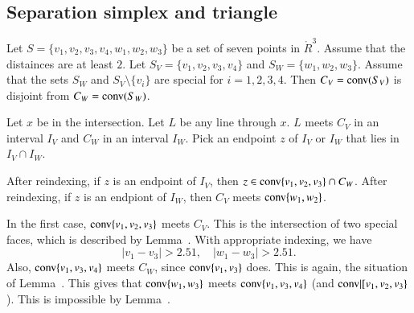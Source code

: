 \begin{tarskidata}
\begin{tarski}
\section{Separation simplex and triangle}

\begin{lemma}
Let $S=\{v_1,v_2,v_3,v_4,w_1,w_2,w_3\}$ be a set of seven points
in $\ring{R}^3$.  Assume that the distainces are at least $2$.
Let $S_V = \{v_1,v_2,v_3,v_4\}$ and $S_W=\{w_1,w_2,w_3\}$.  Assume
that the sets $S_W$ and $S_V\setminus\{v_i\}$ are special for
$i=1,2,3,4$.
Then $C_V={\operatorname{conv}}(S_V)$ is disjoint from $C_W={\operatorname{conv}}(S_W)$.
\end{lemma}

\begin{proved}  Let $x$ be in the intersection.
Let $L$ be any line through $x$.  $L$ meets $C_V$ in an interval
$I_V$ and $C_W$ in an interval $I_W$.  Pick an endpoint $z$
of $I_V$ or $I_W$ that lies in $I_V\cap I_W$.  

After reindexing, if $z$ is an endpoint of $I_V$, then
$z\in{\operatorname{conv}}\{v_1,v_2,v_3\}\cap C_W$.  After reindexing, if $z$
is an endpiont of $I_W$, then $C_V$ meets ${\operatorname{conv}}\{w_1,w_2\}$.

In the first case, ${\operatorname{conv}}\{v_1,v_2,v_3\}$ meets $C_V$.
This is the intersection of two special faces, which is described
by Lemma~.  With appropriate indexing, we have
$$
  |v_1-v_3|>2.51,\quad |w_1-w_3|>2.51.
$$
Also, ${\operatorname{conv}}\{v_1,v_3,v_4\}$ meets $C_W$, since ${\operatorname{conv}}\{v_1,v_3\}$
does.  This is again, the situation of Lemma~.
This gives that ${\operatorname{conv}}\{w_1,w_3\}$ meets ${\operatorname{conv}}\{v_1,v_3,v_4\}$
(and ${\operatorname{conv}}|[v_1,v_2,v_3\}$).  This is impossible by 
Lemma~.
\swallowed\end{proved}
\end{tarski}





\begin{tarski}


\end{tarski}
\end{tarskidata}
